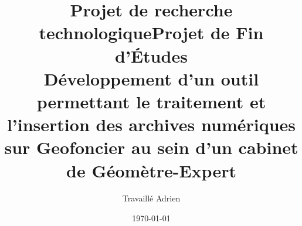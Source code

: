 \documentclass[a4paper,11pt,twoside]{report}
\author{Travaillé Adrien}
\title{Projet de recherche technologique}
\date{\today}
\begin{document}
\title{Projet de Fin d'Études \\[0.5cm] Développement d'un outil permettant le traitement et l'insertion des archives numériques sur Geofoncier au sein d'un cabinet de Géomètre-Expert}


\tableofcontents
\newpage


\newpage


\pagestyle{fancy}
\fancyhf{} %
\fancyhead[R]{\rightmark}
\renewcommand{\sectionmark}[1]{%
\markright{\MakeUppercase{\thesection.\ #1}}}%
\makeatletter
\let\ps@plain=\ps@fancy
\makeatother


\setcounter{page}{1} %










\listoffigures
\thispagestyle{empty}
\listoftables
\thispagestyle{empty}
\listofalgorithms
\thispagestyle{empty}






\end{document}
